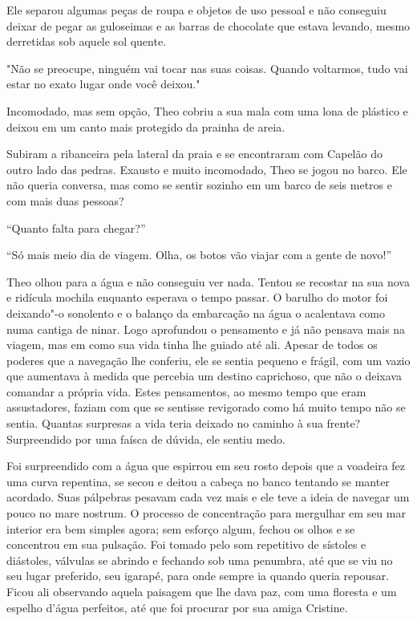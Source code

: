 Ele separou algumas peças de roupa e objetos de uso pessoal e não
conseguiu deixar de pegar as guloseimas e as barras de chocolate que
estava levando, mesmo derretidas sob aquele sol quente.

"Não se preocupe, ninguém vai tocar nas suas coisas. Quando voltarmos,
tudo vai estar no exato lugar onde você deixou."

Incomodado, mas sem opção, Theo cobriu a sua mala com uma lona de
plástico e deixou em um canto mais protegido da prainha de areia.

Subiram a ribanceira pela lateral da praia e se encontraram com Capelão do outro lado das pedras.
Exausto e muito incomodado, Theo se jogou no barco. Ele não queria conversa, mas
como se sentir sozinho em um barco de seis metros e com mais duas
pessoas?

``Quanto falta para chegar?''

``Só mais meio dia de viagem. Olha, os botos vão viajar com a gente de
novo!''

Theo olhou para a água e não conseguiu ver nada. Tentou se recostar na
sua nova e ridícula mochila enquanto esperava o tempo passar. O barulho
do motor foi deixando"-o sonolento e o balanço da embarcação na água o
acalentava como numa cantiga de ninar. Logo aprofundou o pensamento e já
não pensava mais na viagem, mas em como sua vida tinha lhe guiado até
ali. Apesar de todos os poderes que a navegação lhe conferiu, ele se
sentia pequeno e frágil, com um vazio que aumentava à medida que
percebia um destino caprichoso, que não o deixava comandar a própria
vida. Estes pensamentos, ao mesmo tempo que eram assustadores, faziam
com que se sentisse revigorado como há muito tempo não se sentia.
Quantas surpresas a vida teria deixado no caminho à sua frente?
Surpreendido por uma faísca de dúvida, ele sentiu medo.

Foi surpreendido com a água que espirrou em seu rosto depois que a
voadeira fez uma curva repentina, se secou e deitou a cabeça no banco
tentando se manter acordado. Suas pálpebras pesavam cada vez mais e ele
teve a ideia de navegar um pouco no mare nostrum. O processo de
concentração para mergulhar em seu mar interior era bem simples agora;
sem esforço algum, fechou os olhos e se concentrou em sua pulsação. Foi
tomado pelo som repetitivo de sístoles e diástoles, válvulas se abrindo
e fechando sob uma penumbra, até que se viu no seu lugar preferido, seu
igarapé, para onde sempre ia quando queria repousar. Ficou ali
observando aquela paisagem que lhe dava paz, com uma floresta e um
espelho d'água perfeitos, até que foi procurar por sua amiga Cristine.

